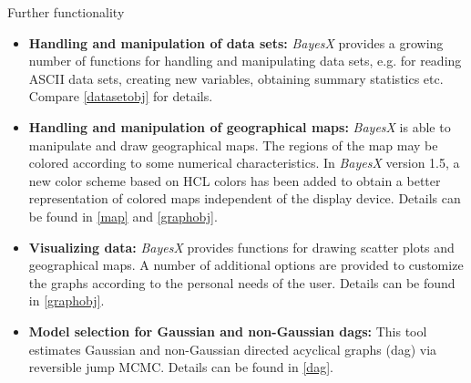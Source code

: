 \begin{stanza}{Further functionality}

\begin{itemize}
\item{\bf\sffamily Handling and manipulation of data sets:} {\em
BayesX} provides a growing number of functions for handling and
manipulating data sets, e.g. for reading ASCII data sets, creating
new variables, obtaining summary statistics etc. Compare
\autoref{datasetobj} for details.

\item{\bf\sffamily Handling and manipulation of geographical
maps:} {\em BayesX} is able to manipulate and draw geographical
maps. The regions of the map may be colored according to some
numerical characteristics. In {\em BayesX} version 1.5, a new
color scheme based on HCL colors has been added to obtain a better
representation of colored maps independent of the display device.
Details can be found in \autoref{map} and \autoref{graphobj}.

\item{\bf\sffamily Visualizing data:} {\em BayesX} provides
functions for drawing scatter plots and geographical maps. A
number of additional options are provided to customize the graphs
according to the personal needs of the user. Details can be found
in \autoref{graphobj}.

\item{\bf\sffamily Model selection for Gaussian and non-Gaussian
dags:} This tool estimates Gaussian and non-Gaussian directed
acyclical graphs (dag) via reversible jump MCMC. Details can be
found in \autoref{dag}.
\end{itemize}
\end{stanza}

